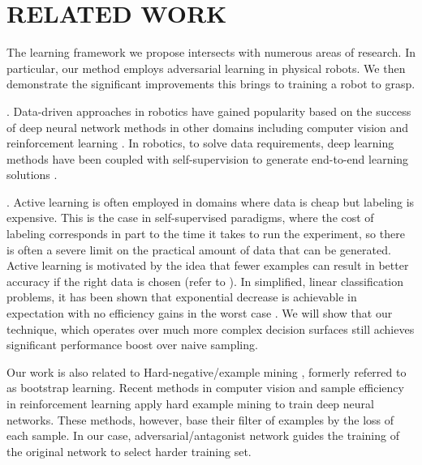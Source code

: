 \documentclass[letterpaper, 10 pt, conference]{ieeeconf}  %
\begin{document}
\section{RELATED WORK}

The learning framework we propose intersects with numerous areas of research. In particular, our method employs adversarial learning in physical robots. We then demonstrate the significant improvements this brings to training a robot to grasp.

.
Data-driven approaches in robotics have gained popularity based on the success of deep neural network methods in other domains including computer vision \cite{krizhevsky2012imagenet} and reinforcement learning \cite{mnih2015human}.  In robotics, to solve data requirements, deep learning methods  have been coupled with self-supervision to generate end-to-end learning solutions  \cite{lenz2015deep, pinto2016supersizing, pinto2016curious, levine2016end, levine2016learning}.  

.
Active learning is often employed in domains where data is cheap but labeling is expensive. This is the case in self-supervised paradigms, where the cost of labeling corresponds in part to the time it takes to run the experiment, so there is often a severe limit on the practical amount of data that can be generated. Active learning is motivated by the idea that fewer examples can result in better accuracy if the right data is chosen (refer to \cite{settles09}). In simplified, linear classification problems, it has been shown that exponential decrease is achievable in expectation with no efficiency gains in the worst case \cite{dasgupta2004analysis}. We will show that our technique, which operates over much more complex decision surfaces still achieves significant performance boost over naive sampling.

Our work is also related to Hard-negative/example mining \cite{sung1994learning, rowley1998neural}, formerly referred to as bootstrap learning. Recent methods in computer vision \cite{loshchilov2015online, simo2014fracking, wang2015unsupervised, shrivastava2016training} and sample efficiency in reinforcement learning \cite{schaul2015prioritized} apply hard example mining to train deep neural networks. These methods, however, base their filter of examples by the loss of each sample. In our case, 
 adversarial/antagonist network guides the training of the original network to select harder training set.
\end{document}
